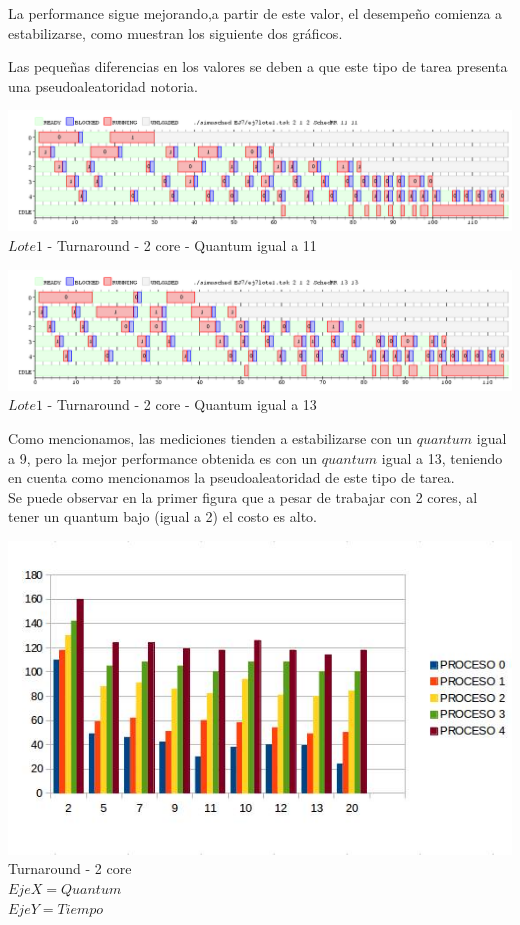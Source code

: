   
   \indent La performance sigue mejorando,a partir de este valor, el desempeño 
   comienza a estabilizarse, como muestran los siguiente dos gráficos. 
   
   Las pequeñas diferencias en los valores se deben a que este tipo de tarea presenta
   una pseudoaleatoridad notoria.\\
  
   \begin{center}
    	\includegraphics[width=450pt]{./EJ7/ej7tour2core5quan.png}
	{$Lote 1$ - Turnaround - 2 core - Quantum igual a 11}	
 \end{center}
 

    \begin{center}
    	\includegraphics[width=450pt]{./EJ7/ej7tour2core8quan.png}
	{$Lote 1$ - Turnaround - 2 core - Quantum igual a 13}	
 \end{center}

 \indent Como mencionamos, las mediciones tienden a estabilizarse con un $quantum$ 
 igual a 9, pero la mejor performance obtenida es con un $quantum$ igual a 13,
 teniendo en cuenta como mencionamos la pseudoaleatoridad de este tipo de tarea.\\
 \indent Se puede observar en la primer figura que a pesar de trabajar con 2 cores, 
 al tener un quantum bajo (igual a 2)  el costo es alto.
  
   \begin{center}
    	\includegraphics[width=1\textwidth]{./EJ7/tour2core.png}
	{Turnaround - 2 core}	\\
	{$Eje X = Quantum$\\$ Eje Y = Tiempo$}\\
 \end{center} 
 
